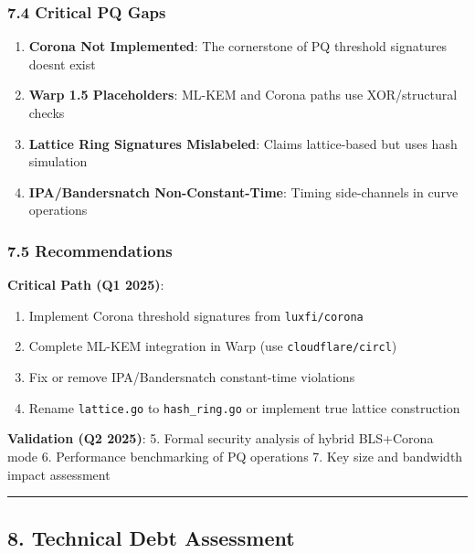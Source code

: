 \documentclass[
]{article}
\providecommand{\tightlist}{%
  \setlength{\itemsep}{0pt}\setlength{\parskip}{0pt}}
\begin{document}
\subsubsection{7.4 Critical PQ Gaps}\label{74-critical-pq-gaps}

\begin{enumerate}
\def\labelenumi{\arabic{enumi}.}
\tightlist
\item
  \textbf{Corona Not Implemented}: The cornerstone of PQ threshold
  signatures doesn\textquotesingle t exist
\item
  \textbf{Warp 1.5 Placeholders}: ML-KEM and Corona paths use
  XOR/structural checks
\item
  \textbf{Lattice Ring Signatures Mislabeled}: Claims lattice-based but
  uses hash simulation
\item
  \textbf{IPA/Bandersnatch Non-Constant-Time}: Timing side-channels in
  curve operations
\end{enumerate}

\subsubsection{7.5 Recommendations}\label{75-recommendations}

\textbf{Critical Path (Q1 2025)}:

\begin{enumerate}
\def\labelenumi{\arabic{enumi}.}
\tightlist
\item
  Implement Corona threshold signatures from \texttt{luxfi/corona}
\item
  Complete ML-KEM integration in Warp (use \texttt{cloudflare/circl})
\item
  Fix or remove IPA/Bandersnatch constant-time violations
\item
  Rename \texttt{lattice.go} to \texttt{hash\_ring.go} or implement true
  lattice construction
\end{enumerate}

\textbf{Validation (Q2 2025)}: 5. Formal security analysis of hybrid
BLS+Corona mode 6. Performance benchmarking of PQ operations 7. Key
size and bandwidth impact assessment

\begin{center}\rule{0.5\linewidth}{0.5pt}\end{center}

\subsection{8. Technical Debt
Assessment}\label{8-technical-debt-assessment}
\end{document}
